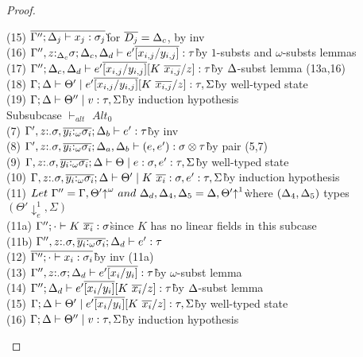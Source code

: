 \documentclass[acmsmall,review,screen]{acmart}
\begin{document}
\begin{proof}
\begin{description}
\begin{tabbing}
    (15) $\overline{\Gamma''; \Delta_j \vdash x_j : \sigma_j}$\` for $\overline{D_j}=\Delta_c$, by inv\\
    (16) $\Gamma'', z{:}_{\Delta_c}\sigma; \Delta_c, \Delta_d \vdash e'\overline{[x_{i,j}/y_{i,j}]} : \tau$\`by $1$-substs and $\omega$-substs lemmas\\
    (17) $\Gamma''; \Delta_c, \Delta_d \vdash e'\overline{[x_{i,j}/y_{i,j}]}[K~\overline{x_{i,j}}/z] : \tau$\`by $\Delta$-subst lemma (13a,16)\\
    (18) $\Gamma; \Delta \vdash \Theta' \mid e'\overline{[x_{i,j}/y_{i,j}]}[K~\overline{x_{i,j}}/z] : \tau, \Sigma$\`by well-typed state\\
    (19) $\Gamma; \Delta \vdash \Theta'' \mid v : \tau, \Sigma$\`by induction hypothesis\\
    Subsubcase $\vdash_{alt}$ $Alt_0$\\
    (7) $\Gamma', z{:}_\cdot\sigma, \overline{y_i{:}_\omega\sigma_i}; \Delta_b \vdash e' : \tau$\` by inv\\
    (8) $\Gamma', z{:}_\cdot\sigma, \overline{y_i{:}_\omega\sigma_i}; \Delta_a, \Delta_b \vdash (e, e') : \sigma \otimes \tau$\` by pair (5,7)\\
    (9) $\Gamma, z{:}_\cdot\sigma, \overline{y_i{:}_\omega\sigma_i}; \Delta \vdash \Theta \mid e : \sigma, e' : \tau, \Sigma$\` by well-typed state\\
    (10) $\Gamma, z{:}_\cdot\sigma, \overline{y_i{:}_\omega\sigma_i}; \Delta \vdash \Theta' \mid K~\overline{x_i} : \sigma, e' : \tau, \Sigma$\` by induction hypothesis\\
    (11) $Let~\Gamma'' = \Gamma,\Theta'{\uparrow}^\omega~and~\Delta_d,\Delta_4,\Delta_5 = \Delta, \Theta'{\uparrow}^1$\` where $(\Delta_4, \Delta_5)$ types $(\Theta'{\downarrow^1_e}, \Sigma)$\\
    (11a) $\Gamma''; \cdot \vdash K~\overline{x_i} : \sigma$\`since $K$ has no linear fields in this subcase\\
    (11b) $\Gamma'', z{:}_{\cdot}\sigma, \overline{y_i{:}_\omega\sigma_i}; \Delta_d \vdash e' : \tau$\\
    (12) $\overline{\Gamma''; \cdot \vdash x_{i} : \sigma_i}$\`by inv (11a)\\
    (13) $\Gamma'', z{:}_{\cdot}\sigma; \Delta_d \vdash e'\overline{[x_i/y_i]} : \tau$\` by $\omega$-subst lemma\\
    (14) $\Gamma''; \Delta_d \vdash e'\overline{[x_i/y_i]}[K~\overline{x_i}/z] : \tau$\` by $\Delta$-subst lemma\\
    (15) $\Gamma; \Delta \vdash \Theta' \mid e'\overline{[x_i/y_i]}[K~\overline{x_i}/z] :
    \tau, \Sigma$\` by well-typed state\\
    (16) $\Gamma; \Delta \vdash \Theta'' \mid v : \tau, \Sigma$\` by induction hypothesis\\

\end{tabbing}
\end{description}
\end{proof}
\end{document}
